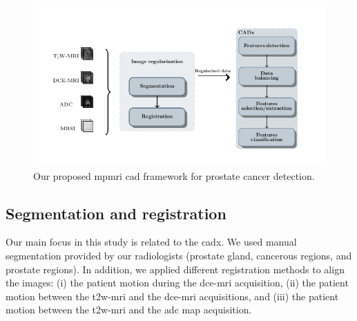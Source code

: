\documentclass[a4paper,num-refs]{wiley-article}
\begin{document}
\begin{figure}
  \centering
  \includegraphics[width=0.7\linewidth]{./images/cad/wkfcad.pdf}
  \caption{Our proposed \ac{mpmri} \ac{cad} framework for prostate cancer
    detection.}
  \label{fig:wkfcad}
\end{figure}

\subsection{Segmentation and registration}

Our main focus in this study is related to the \ac{cadx}. We used manual
segmentation provided by our radiologists (prostate gland, cancerous regions,
and prostate regions). In addition, we applied different registration methods
to align the images: (i) the patient motion during the \ac{dce}-\ac{mri}
acquisition, (ii) the patient motion between the \ac{t2w}-\ac{mri} and the
\ac{dce}-\ac{mri} acquisitions, and (iii) the patient motion between the
\ac{t2w}-\ac{mri} and the \ac{adc} map acquisition.
\end{document}
